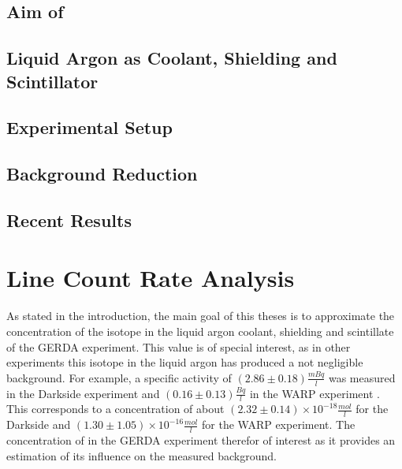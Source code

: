 \documentclass[encoding=utf8,british]{tumphthesis}
\begin{document}

\section{Aim of \GERDA}
\label{sec:AimGERDA}



\section{Liquid Argon as Coolant, Shielding and Scintillator} 
\label{sec:LArcoolant}


\section{Experimental Setup}
\label{sec:ExSetup}


\section{Background Reduction}
\label{sec:BGReduction}



\section{Recent Results}
\label{sec:ResultsofGERDA}


 
\chapter{Line Count Rate Analysis}
\label{sec:SAfrom514}


As stated in the introduction, the main goal of this theses is to approximate the concentration of the isotope \Kr in the liquid argon coolant, shielding and scintillate of the GERDA experiment. 
This value is of special interest, as in other experiments this isotope in the liquid argon has produced a not negligible background. 
For example, a specific activity of  \((2.86\pm0.18) \frac{\unit{mBq}}{\unit{l}}\) was measured in the Darkside experiment \cite{PhysRevD.93.081101} and \((0.16\pm0.13)\frac{\unit{Bq}}{\unit{l}}\) in the WARP experiment \cite{Benetti:2006az}.
This corresponds to a concentration of about \((2.32\pm0.14)\times10^{-18}\frac{\unit{mol}}{\unit{l}}\) for the Darkside and  \((1.30\pm1.05)\times10^{-16}\frac{\unit{mol}}{\unit{l}}\) for the WARP experiment.
The concentration of \Kr in the GERDA experiment therefor of interest as it provides an estimation of its influence on the measured background.
\\
\end{document}
